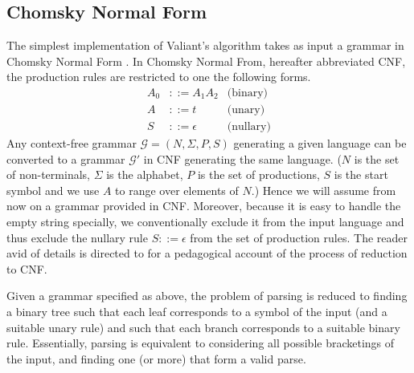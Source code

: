 \documentclass{CSML}
\numberwithin{theorem}{section}
\begin{document}
\subsection{Chomsky Normal Form}
The simplest implementation of Valiant's algorithm takes as
input a grammar in Chomsky Normal Form \citep{chomsky_certain_1959}. In
Chomsky Normal From, hereafter abbreviated CNF, the production rules
are restricted to one the following forms.
\begin{align*}
A_0 &::= A_1 A_2 & \text{(binary)} \\
A &::= t       & \text{(unary)}  \\
S &::= \epsilon  & \text{(nullary)}
\end{align*}
Any context-free grammar $\mathcal G = (N, \Sigma, P, S)$ generating a
given language can be converted to a grammar $\mathcal G'$ in CNF
generating the same language.
($N$ is the set of non-terminals, $\Sigma$ is the alphabet, $P$ is the
set of productions, $S$ is the start symbol and we use $A$ to range
over elements of $N$.)
Hence we will assume from now on a grammar provided in CNF.
Moreover, because it is easy to handle the empty string specially, we
conventionally exclude it from the input language and thus exclude the
nullary rule $S ::= \epsilon$ from the set of production rules.
The reader avid of details is directed to \citet{lange_cnf_2009} for a
pedagogical account of the process of reduction to CNF.

Given a grammar specified as above, the problem of parsing is reduced
to finding a binary tree such that each leaf corresponds to a symbol
of the input (and a suitable unary rule) and such that each branch corresponds to
a suitable binary rule. Essentially, parsing is equivalent to considering
all possible bracketings of the input, and finding one (or more) that form a
valid parse.
\end{document}
